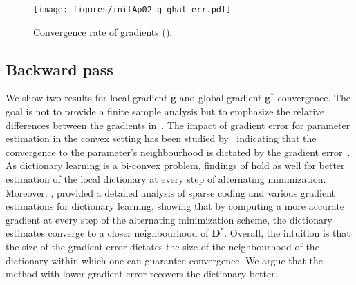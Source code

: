 \documentclass[10pt]{article} %
\newcommand{\D}{{\bm D}}
\newcommand{\g}{{\bm g}}
\begin{document}
%
%
\begin{wrapfigure}[14]{r}{0.38\textwidth}
\vspace{-5mm}
	\texttt{[image: figures/initAp02\_g\_ghat\_err.pdf]}
	\caption{Convergence rate of gradients ().}
	\label{fig:localgradient}
\end{wrapfigure}
%
\subsection{Backward pass}\label{sec:backward}
We show two results for local gradient $\hat \g$ and global gradient $\g^{\ast}$ convergence. The goal is not to provide a finite sample analysis but to emphasize the relative differences between the gradients in~. The impact of gradient error for parameter estimation in the convex setting has been studied by~\citet{devolder2013first} indicating that the convergence to the parameter's neighbourhood is dictated by the gradient error~\citep{devolder2013first, devolder2014first}. As dictionary learning is a bi-convex problem, findings of \citet{devolder2013first} hold as well for better estimation of the local dictionary at every step of alternating minimization. Moreover, \citet{arora2015sparsecoding}, provided a detailed analysis of sparse coding and various gradient estimations for dictionary learning, showing that by computing a more accurate gradient at every step of the alternating minimization scheme, the dictionary estimates converge to a closer neighbourhood of $\D^{\ast}$. Overall, the intuition is that the size of the gradient error dictates the size of the neighbourhood of the dictionary within which one can guarantee convergence. We argue that the method with lower gradient error recovers the dictionary better.
%

\end{document}
